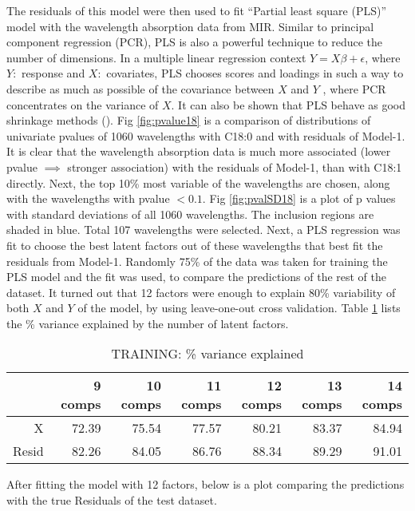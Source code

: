 The residuals of this model were then used to fit ``Partial least square (PLS)''  \cite{Mevik_Wehrens_2007_JSS} model with the wavelength absorption data from MIR. Similar to principal component regression (PCR), PLS is also a powerful technique to reduce the number of dimensions. In a multiple linear regression context $Y = X\beta + \epsilon$, where $Y:$ response and $X:$ covariates, PLS chooses scores and loadings in such a way to describe as much as possible of the covariance between $X$ and $Y$ , where PCR concentrates on the variance of $X$. It can also be shown that PLS behave as good shrinkage methods (\cite{Hastie_etal_2009_Elements}). Fig \ref{fig:pvalue18} is a comparison of distributions of univariate pvalues of 1060 wavelengths with C18:0 and with residuals of Model-1. 
It is clear that the wavelength absorption data is much more associated (lower pvalue $\implies$ stronger association) with the residuals of Model-1, than with C18:1 directly. Next, the top 10\% most variable of the wavelengths are chosen, along with the wavelengths with pvalue $< 0.1$. Fig \ref{fig:pvalSD18} is a plot of p values with standard deviations of all 1060 wavelengths. The inclusion regions are shaded in blue. Total 107 wavelengths were selected.
Next, a PLS regression was fit to choose the best latent factors out of these wavelengths that best fit the residuals from Model-1. Randomly 75\% of the data was taken for training the PLS model and the fit was used, to compare the predictions of the rest of the dataset. It turned out that 12 factors were enough to explain 80\% variability of both $X$ and $Y$ of the model, by using leave-one-out cross validation. Table \ref{Tab:plsr18} lists the \% variance explained by the number of latent factors.
\begin{table}[H]
\centering
\begin{tabular}{rrrrrrr}
  \hline
      & 9 comps & 10 comps & 11 comps & 12 comps & 13 comps & 14 comps \\
  \hline
  X   & 72.39   &  75.54   &  77.57   & 80.21    & 83.37    & 84.94 \\
Resid & 82.26   &  84.05   &  86.76   & 88.34    & 89.29    & 91.01 \\
  \hline
\end{tabular}
\caption{TRAINING: \% variance explained}
\label{Tab:plsr18}
\end{table}
After fitting the model with 12 factors, below is a plot comparing the predictions with the true Residuals of the test dataset.

